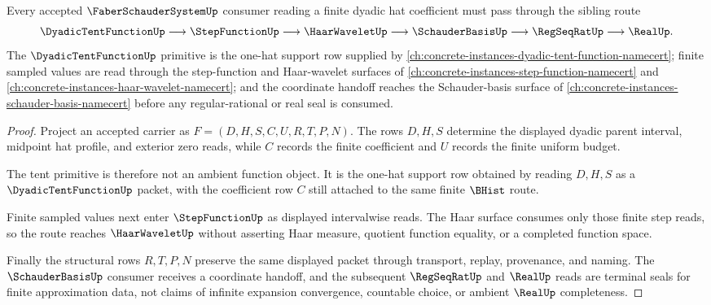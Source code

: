 \begin{theorem}
\label{thm:faber-schauder-system-haar-step-schauder-route}
Every accepted $\FaberSchauderSystemUp$ consumer reading a finite dyadic hat coefficient must pass through the sibling route
$$
\DyadicTentFunctionUp \longrightarrow \StepFunctionUp \longrightarrow \HaarWaveletUp \longrightarrow \SchauderBasisUp \longrightarrow \RegSeqRatUp \longrightarrow \RealUp .
$$
The $\DyadicTentFunctionUp$ primitive is the one-hat support row supplied by \autoref{ch:concrete-instances-dyadic-tent-function-namecert}; finite sampled values are read through the step-function and Haar-wavelet surfaces of \autoref{ch:concrete-instances-step-function-namecert} and \autoref{ch:concrete-instances-haar-wavelet-namecert}; and the coordinate handoff reaches the Schauder-basis surface of \autoref{ch:concrete-instances-schauder-basis-namecert} before any regular-rational or real seal is consumed.
\end{theorem}
\begin{proof}
Project an accepted carrier as $F=(D,H,S,C,U,R,T,P,N)$. The rows $D,H,S$ determine the displayed dyadic parent interval, midpoint hat profile, and exterior zero reads, while $C$ records the finite coefficient and $U$ records the finite uniform budget.

The tent primitive is therefore not an ambient function object. It is the one-hat support row obtained by reading $D,H,S$ as a $\DyadicTentFunctionUp$ packet, with the coefficient row $C$ still attached to the same finite $\BHist$ route.

Finite sampled values next enter $\StepFunctionUp$ as displayed intervalwise reads. The Haar surface consumes only those finite step reads, so the route reaches $\HaarWaveletUp$ without asserting Haar measure, quotient function equality, or a completed function space.

Finally the structural rows $R,T,P,N$ preserve the same displayed packet through transport, replay, provenance, and naming. The $\SchauderBasisUp$ consumer receives a coordinate handoff, and the subsequent $\RegSeqRatUp$ and $\RealUp$ reads are terminal seals for finite approximation data, not claims of infinite expansion convergence, countable choice, or ambient $\RealUp$ completeness.
\end{proof}


